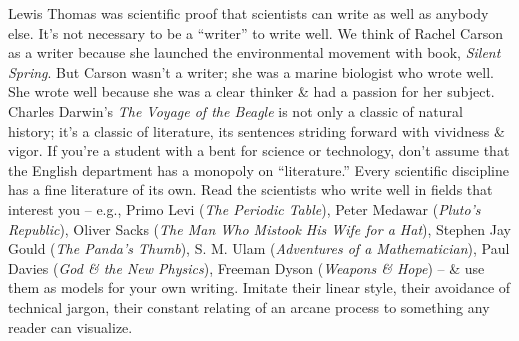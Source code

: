 \documentclass{article}
\begin{document}
Lewis Thomas was scientific proof that scientists can write as well as anybody else. It's not necessary to be a ``writer'' to write well. We think of Rachel Carson as a writer because she launched the environmental movement with  book, \textit{Silent Spring}. But Carson wasn't a writer; she was a marine biologist who wrote well. She wrote well because she was a clear thinker \& had a passion for her subject. Charles Darwin's \textit{The Voyage of the Beagle} is not only a classic of natural history; it's a classic of literature, its sentences striding forward with vividness \& vigor. If you're a student with a bent for science or technology, don't assume that the English department has a monopoly on ``literature.'' Every scientific discipline has a fine literature of its own. Read the scientists who write well in fields that interest you -- e.g., Primo Levi (\textit{The Periodic Table}), Peter Medawar (\textit{Pluto's Republic}), Oliver Sacks (\textit{The Man Who Mistook His Wife for a Hat}), Stephen Jay Gould (\textit{The Panda's Thumb}), S. M. Ulam (\textit{Adventures of a Mathematician}), Paul Davies (\textit{God \& the New Physics}), Freeman Dyson (\textit{Weapons \& Hope}) -- \& use them as models for your own writing. Imitate their linear style, their avoidance of technical jargon, their constant relating of an arcane process to something any reader can visualize.
\end{document}
